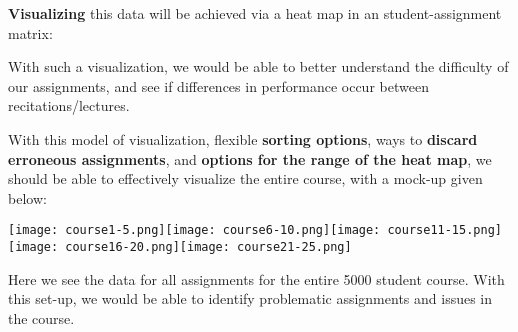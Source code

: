\documentclass{techbrief}
\begin{document}
\begin{xframe}
    \textbf{Visualizing} this data will be achieved via a heat map in an student-assignment matrix:
    \begin{center}
    \end{center}   
    With such a visualization, we would be able to better understand the difficulty of our assignments, and see if differences in performance occur between recitations/lectures.
\end{xframe}

\restoregeometry
\onecolumn\noindent
With this model of visualization, flexible \textbf{sorting options}, ways to \textbf{discard erroneous assignments}, and \textbf{options for the range of the heat map}, we should be able to effectively visualize the entire course, with a mock-up given below:
\begin{center}
\texttt{[image: course1-5.png]}\texttt{[image: course6-10.png]}\texttt{[image: course11-15.png]}\texttt{[image: course16-20.png]}\texttt{[image: course21-25.png]}
\end{center}
Here we see the data for all assignments for the entire 5000 student course. With this set-up, we would be able to identify problematic assignments and issues in the course.
\end{document}
